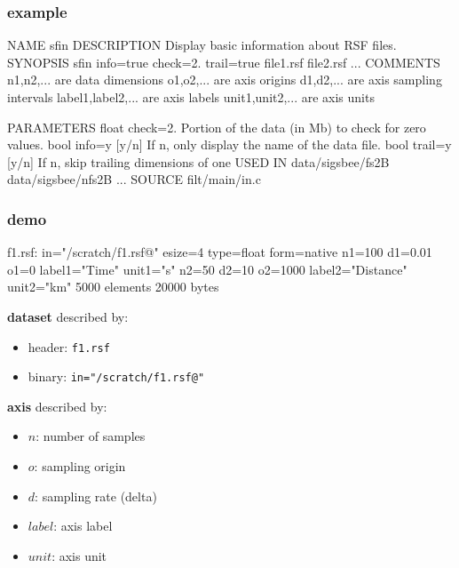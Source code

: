 \begin{frame}[fragile] \frametitle{example}


\tiny
\begin{semiverbatim}
NAME
        sfin
DESCRIPTION
        Display basic information about RSF files.
SYNOPSIS
        sfin info=true check=2. trail=true file1.rsf file2.rsf ...
COMMENTS
        n1,n2,... are data dimensions
        o1,o2,... are axis origins
        d1,d2,... are axis sampling intervals
        label1,label2,... are axis labels
        unit1,unit2,... are axis units

PARAMETERS
        float   check=2.        Portion of the data (in Mb) to check for zero values.
        bool    info=y [y/n]    If n, only display the name of the data file.
        bool    trail=y [y/n]   If n, skip trailing dimensions of  one
USED IN
        data/sigsbee/fs2B
        data/sigsbee/nfs2B
	...
SOURCE
        filt/main/in.c
\end{semiverbatim}
\end{frame}
\cwpnote{}

\begin{frame}[fragile] \frametitle{demo}


\tiny
\begin{semiverbatim}
f1.rsf:
    in="/scratch/f1.rsf@"
    esize=4 type=float form=native
    n1=100         d1=0.01        o1=0          label1="Time" unit1="s"
    n2=50          d2=10          o2=1000       label2="Distance" unit2="km"
        5000 elements 20000 bytes
\end{semiverbatim}
\end{frame}
\cwpnote{}

\begin{frame}

  \textbf{dataset} described by:
  \begin{itemize}
  \item header: \texttt{f1.rsf}
  \item binary: \texttt{in="/scratch/f1.rsf@"}
  \end{itemize}

  \vfill

  \textbf{axis} described by:
  \begin{itemize}
  \item $n$: number of samples
  \item $o$: sampling origin
  \item $d$: sampling rate (delta)
  \item $label$: axis label
  \item $unit$: axis unit
  \end{itemize}

\end{frame}
\cwpnote{}

